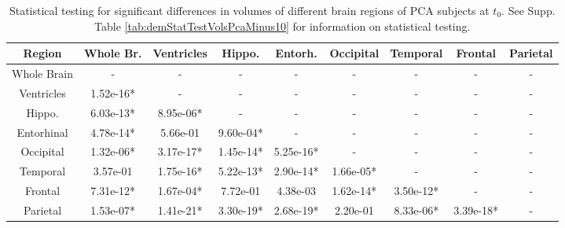 
\begin{table}
\centering
\begin{tabular}{c |c c c c c c c c }
Region & Whole Br. & Ventricles & Hippo. & Entorh. & Occipital & Temporal & Frontal & Parietal\\
\hline 
Whole Brain & - & - & - & - & - & - & - & -\\
Ventricles & 1.52e-16* & - & - & - & - & - & - & -\\
Hippo. & 6.03e-13* & 8.95e-06* & - & - & - & - & - & -\\
Entorhinal & 4.78e-14* & 5.66e-01 & 9.60e-04* & - & - & - & - & -\\
Occipital & 1.32e-06* & 3.17e-17* & 1.45e-14* & 5.25e-16* & - & - & - & -\\
Temporal & 3.57e-01 & 1.75e-16* & 5.22e-13* & 2.90e-14* & 1.66e-05* & - & - & -\\
Frontal & 7.31e-12* & 1.67e-04* & 7.72e-01 & 4.38e-03 & 1.62e-14* & 3.50e-12* & - & -\\
Parietal & 1.53e-07* & 1.41e-21* & 3.30e-19* & 2.68e-19* & 2.20e-01 & 8.33e-06* & 3.39e-18* & -\\


\end{tabular} 
\caption[Statistical testing for significant differences in volumes of different brain regions of PCA subjects at $t_0$]{Statistical testing for significant differences in volumes of different brain regions of PCA subjects at $t_0$. See Supp. Table \ref{tab:demStatTestVolsPcaMinus10} for information on statistical testing.} 
\label{tab:demStatTestVolsPca0}
\end{table}


